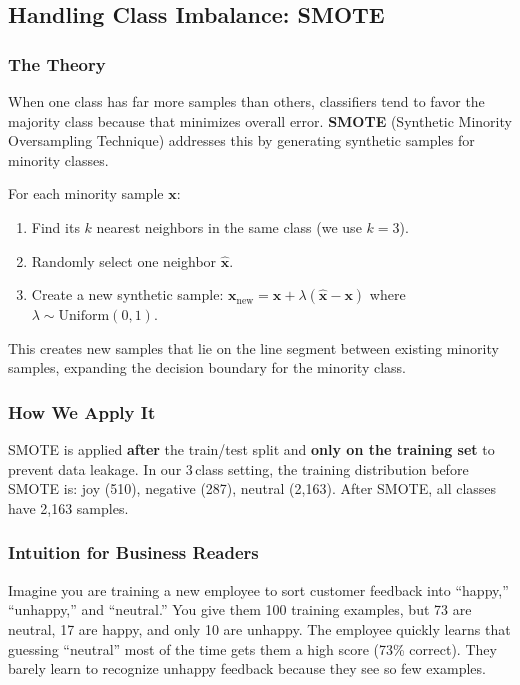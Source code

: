 \documentclass[12pt,a4paper,twoside]{article}
\theoremstyle{definition}
\begin{document}
\subsection{Handling Class Imbalance: SMOTE}

\subsubsection{The Theory}

When one class has far more samples than others, classifiers tend to favor the majority class because that minimizes overall error. \textbf{SMOTE} (Synthetic Minority Oversampling Technique) \citep{chawla2002smote} addresses this by generating synthetic samples for minority classes.

For each minority sample $\mathbf{x}$:
\begin{enumerate}[leftmargin=2em]
    \item Find its $k$ nearest neighbors in the same class (we use $k=3$).
    \item Randomly select one neighbor $\hat{\mathbf{x}}$.
    \item Create a new synthetic sample: $\mathbf{x}_{\text{new}} = \mathbf{x} + \lambda(\hat{\mathbf{x}} - \mathbf{x})$ where $\lambda \sim \text{Uniform}(0,1)$.
\end{enumerate}

This creates new samples that lie on the line segment between existing minority samples, expanding the decision boundary for the minority class.

\subsubsection{How We Apply It}

SMOTE is applied \textbf{after} the train/test split and \textbf{only on the training set} to prevent data leakage. In our 3\,class setting, the training distribution before SMOTE is: joy (510), negative (287), neutral (2{,}163). After SMOTE, all classes have 2{,}163 samples.


\subsubsection{Intuition for Business Readers}
 
Imagine you are training a new employee to sort customer feedback into ``happy,'' ``unhappy,'' and ``neutral.'' You give them 100 training examples, but 73 are neutral, 17 are happy, and only 10 are unhappy. The employee quickly learns that guessing ``neutral'' most of the time gets them a high score (73\% correct). They barely learn to recognize unhappy feedback because they see so few examples.
 
\end{document}
